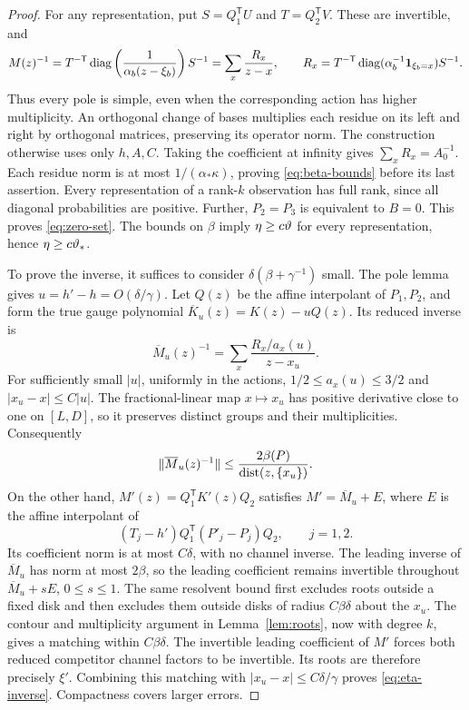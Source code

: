 \begin{proof}
For any representation, put $S=Q_1^{\mathsf T}U$ and
$T=Q_2^{\mathsf T}V$. These are invertible, and
\begin{equation}\label{eq:residue-formula}
 M(z)^{-1}=T^{-\mathsf T}
       \operatorname{diag}\left(\frac{1}{\alpha_b(z-\xi_b)}\right)S^{-1}
       =\sum_x\frac{R_x}{z-x},\qquad
 R_x=T^{-\mathsf T}\operatorname{diag}(\alpha_b^{-1}\mathbf1_{\xi_b=x})S^{-1}.
\end{equation}
Thus every pole is simple, even when the corresponding action has
higher multiplicity. An orthogonal change of bases multiplies each
residue on its left and right by orthogonal matrices, preserving its
operator norm. The construction otherwise uses only $h,A,C$.
Taking the coefficient at infinity gives
$\sum_xR_x=A_0^{-1}$. Each residue norm is at most
$1/(\alpha_*\kappa)$, proving \eqref{eq:beta-bounds} before its last
assertion. Every representation of a rank-$k$ observation has full
rank, since all diagonal probabilities are positive. Further,
$P_2=P_3$ is equivalent to $B=0$. This proves \eqref{eq:zero-set}.
The bounds on $\beta$ imply $\eta\ge c\vartheta$ for every
representation, hence $\eta\ge c\vartheta_*$.

To prove the inverse, it suffices to consider
$\delta(\beta+\gamma^{-1})$ small. The pole lemma gives
$u=h'-h=O(\delta/\gamma)$. Let $Q(z)$ be the affine interpolant of
$P_1,P_2$, and form the true gauge polynomial
$\overline K_u(z)=K(z)-uQ(z)$. Its reduced inverse is
\begin{equation}\label{eq:gauged-resolvent}
 \overline M_u(z)^{-1}
       =\sum_x\frac{R_x/a_x(u)}{z-x_u}.
\end{equation}
For sufficiently small $|u|$, uniformly in the actions,
$1/2\le a_x(u)\le3/2$ and $|x_u-x|\le C|u|$.
The fractional-linear map $x\mapsto x_u$ has positive derivative
close to one on $[L,D]$, so it preserves distinct groups and their
multiplicities. Consequently
\[
 \|\overline M_u(z)^{-1}\|
                 \le\frac{2\beta(P)}{\operatorname{dist}(z,\{x_u\})}.
\]
On the other hand, $M'(z)=Q_1^{\mathsf T}K'(z)Q_2$ satisfies
$M'=\overline M_u+E$, where $E$ is the affine interpolant of
\[
 (T_j-h')Q_1^{\mathsf T}(P'_j-P_j)Q_2,\qquad j=1,2.
\]
Its coefficient norm is at most $C\delta$, with no channel inverse.
The leading inverse of $\overline M_u$ has norm at most $2\beta$,
so the leading coefficient remains invertible throughout
$\overline M_u+sE$, $0\le s\le1$. The same resolvent bound first
excludes roots outside a fixed disk and then excludes them outside
disks of radius $C\beta\delta$ about the $x_u$. The contour and
multiplicity argument in Lemma~\ref{lem:roots}, now with degree $k$,
gives a matching within $C\beta\delta$. The invertible leading
coefficient of $M'$ forces both reduced competitor channel factors
to be invertible. Its roots are therefore precisely $\xi'$.
Combining this matching with $|x_u-x|\le C\delta/\gamma$ proves
\eqref{eq:eta-inverse}. Compactness covers larger errors.


\end{proof}
